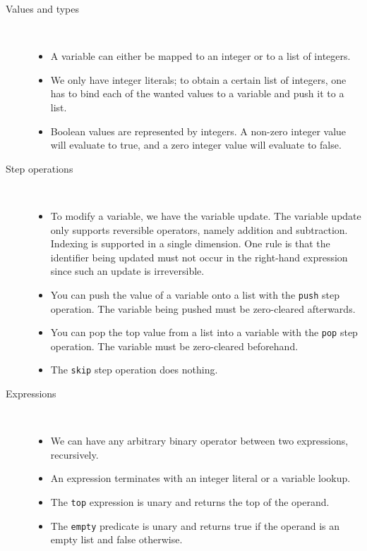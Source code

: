 \begin{description}
  \item[Values and types]~\
  \begin{itemize}
    \item A variable can either be mapped to an integer or to a list of integers.
    \item We only have integer literals; to obtain a certain list of integers, one has to bind each of the wanted values to a variable and push it to a list.
    \item Boolean values are represented by integers. A non-zero integer value will evaluate to true, and a zero integer value will evaluate to false.
  \end{itemize}
  \item [Step operations]~\
  \begin{itemize}
    \item To modify a variable, we have the variable update. The variable update only supports reversible operators, namely addition and subtraction. Indexing is supported in a single dimension. One rule is that the identifier being updated must not occur in the right-hand expression since such an update is irreversible.
    \item You can push the value of a variable onto a list with the \texttt{push} step operation. The variable being pushed must be zero-cleared afterwards.
    \item You can pop the top value from a list into a variable with the \texttt{pop} step operation. The variable must be zero-cleared beforehand.
    \item The \texttt{skip} step operation does nothing.
  \end{itemize}
  \item [Expressions]~\
  \begin{itemize}
    \item We can have any arbitrary binary operator between two expressions, recursively.
    \item An expression terminates with an integer literal or a variable lookup.
    \item The \texttt{top} expression is unary and returns the top of the operand.
    \item The \texttt{empty} predicate is unary and returns true if the operand is an empty list and false otherwise.
  \end{itemize}
\end{description}

